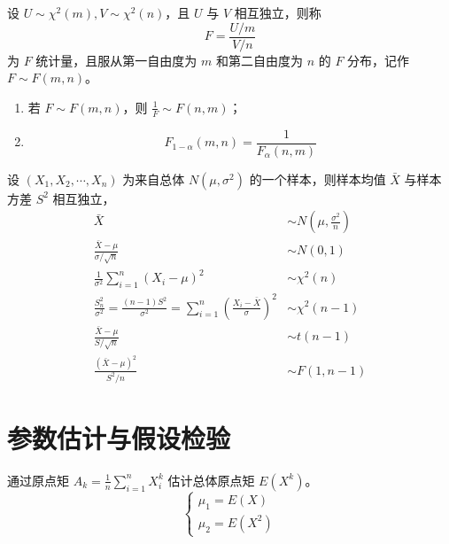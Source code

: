 \documentclass{ctexbook}
\begin{document}
\begin{definition}[$F$ 分布]
    设 $U\sim\chi^2(m), V\sim\chi^2(n)$，且 $U$ 与 $V$ 相互独立，则称
    \begin{equation}
        F=\frac{U/m}{V/n}
    \end{equation}
    为 $F$ 统计量，且服从第一自由度为 $m$ 和第二自由度为 $n$ 的 $F$ 分布，记作 $F\sim F(m,n)$。

    \begin{enumerate}
        \item 若 $F\sim F(m,n)$，则 $\frac{1}{F}\sim F(n,m)$；
        \item \begin{equation}
            F_{1-\alpha}(m,n)=\frac{1}{F_\alpha(n,m)}
        \end{equation}
    \end{enumerate}
\end{definition}

\begin{theorem}[正态总体下的常用结论]
    设 $(X_1,X_2,\cdots,X_n)$ 为来自总体 $N(\mu,\sigma^2)$ 的一个样本，则样本均值 $\bar{X}$ 与样本方差 $S^2$ 相互独立，
    \begin{align}
        \bar{X}&\sim N(\mu,\frac{\sigma^2}{n})\\
        \frac{\bar{X}-\mu}{\sigma/\sqrt{n}}&\sim N(0,1)\\
        \frac{1}{\sigma^2}\sum_{i=1}^n(X_i-\mu)^2&\sim\chi^2(n)\\
        \frac{S_n^2}{\sigma^2}=\frac{(n-1)S^2}{\sigma^2}=\sum_{i=1}^n\left(\frac{X_i-\bar{X}}{\sigma}\right)^2&\sim\chi^2(n-1)\\
        \frac{\bar{X}-\mu}{S/\sqrt{n}}&\sim t(n-1)\\
        \frac{(\bar{X}-\mu)^2}{S^2/n}&\sim F(1,n-1)
    \end{align}
\end{theorem}

\chapter{参数估计与假设检验}

\begin{definition}[矩估计法]
    通过原点矩 $A_k=\frac{1}{n}\sum_{i=1}^n X_i^k$ 估计总体原点矩 $E(X^k)$。
    \begin{equation}
        \begin{cases}
            \mu_1=E(X)\\
            \mu_2=E(X^2)
        \end{cases}
    \end{equation}
\end{definition}
\end{document}
